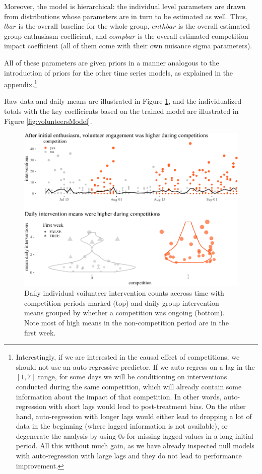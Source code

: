 \documentclass[
  10pt,
  dvipsnames, enabledeprecatedfontcommands]{scrartcl}
\begin{document}
\noindent Moreover, the model is hierarchical: the individual level
parameters are drawn from distributions whose parameters are in turn to
be estimated as well. Thus, \(lbar\) is the overall baseline for the
whole group, \(enthbar\) is the overall estimated group enthusiasm
coefficient, and \(compbar\) is the overall estimated competition impact
coefficient (all of them come with their own nuisance sigma parameters).

\noindent All of these parameters are given priors in a manner analogous
to the introduction of priors for the other time series models, as
explained in the appendix.\footnote{Interestingly, if we are interested
  in the causal effect of competitions, we should not use an
  auto-regressive predictor. If we auto-regress on a lag in the
  \([1,7]\) range, for some days we will be conditioning on
  interventions conducted during the same competition, which will
  already contain some information about the impact of that competition.
  In other words, auto-regression with short lags would lead to
  post-treatment bias. On the other hand, auto-regression with longer
  lags would either lead to dropping a lot of data in the beginning
  (where lagged information is not available), or degenerate the
  analysis by using 0s for missing lagged values in a long initial
  period. All this without much gain, as we have already inspected null
  models with auto-regression with large lags and they do not lead to
  performance improvement.}

Raw data and daily means are illustrated in Figure
\ref{fig:volunteersBasic}, and the individualized totals with the key
coefficients based on the trained model are illustrated in Figure
\ref{fig:volunteersModel}.

\begin{figure}

\begin{center}\includegraphics[width=1\linewidth]{reportVolunteers_files/figure-latex/fig:volunteersBasic5-1} \end{center}
\caption{Daily individual voilunteer intervention counts accross time with competition periods marked (top) and daily group intervention means grouped by whether a competition was ongoing (bottom). Note most of high means in the non-competition period are in the first week.}
\label{fig:volunteersBasic}
\end{figure}
\end{document}
